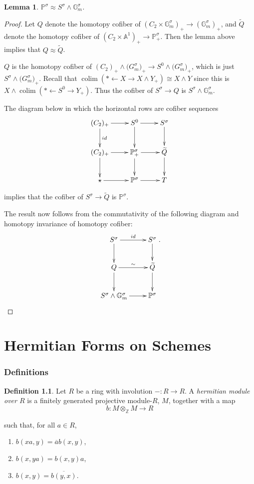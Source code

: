 \documentclass[draftthesis,tocnosub,noragright,centerchapter,10pt]{uiucthesis2009}
\newcommand{\Z}{\mathbb Z}
\newcommand{\mbb}{\mathbb}
\DeclareMathOperator*{\colim}{colim}
\theoremstyle{plain}
\newtheorem{lemma}{Lemma}
\theoremstyle{definition}
\newtheorem{definition}[lemma]{Definition}
\begin{document}
\begin{lemma}
$\mbb P^\sigma \approx S^\sigma \wedge \mbb G_m^\sigma$.
\end{lemma}

\begin{proof}
Let $Q$ denote the homotopy cofiber of $(C_2 \times \mbb G_m^\sigma)_+
\rightarrow (\mbb G_m^\sigma)_+$, and $\widetilde Q$ denote the homotopy
cofiber of $(C_2 \times \mbb A^1)_+ \rightarrow \mbb P^\sigma_+$. Then the
lemma above implies that $Q \approx \widetilde Q$. 

$Q$ is the homotopy cofiber of $
(C_2)_+ \wedge \mbb (G_m^\sigma)_+ \rightarrow S^0 \wedge \mbb
(G_m^\sigma)_+$, which is just $S^\sigma \wedge \mbb
(G_m^\sigma)_+$. Recall that $\colim(* \leftarrow X \rightarrow X
\wedge Y_+) \cong X \wedge Y$ since this is $X \wedge \colim(*
\leftarrow S^0 \rightarrow Y_+)$. Thus the cofiber of $S^\sigma
\rightarrow Q$ is $S^\sigma \wedge \mbb G_m^\sigma$.

The diagram below in which the horizontal rows are cofiber sequences
\[
\xymatrix{(C_2)_+ \ar[r]\ar[d]^{id} & S^0 \ar[d] \ar[r]& S^\sigma
  \ar[d] \\(C_2)_+ \ar[r]\ar[d] & \ar[r]\ar[d] \mbb P^\sigma_+ & \widetilde
  Q \ar[d] \\ \star \ar[r] & \mbb P^\sigma \ar[r] & T }
\]

implies that the cofiber of $S^\sigma \rightarrow \widetilde Q$ is
$\mbb P^\sigma$. 

The result now follows from the commutativity of the following diagram
and homotopy invariance of homotopy cofiber:
\[
\xymatrix{S^\sigma \ar[r]^{id}\ar[d] & S^\sigma \ar[d] \\ Q \ar[r]^{\sim} \ar[d]&
\widetilde Q \ar[d]\\ S^\sigma \wedge \mbb G_m^\sigma \ar[r] & \mbb P^\sigma}.
\]

\end{proof}

\chapter{Hermitian Forms on Schemes}\label{chap:herm_form_sch}

\subsection{Definitions}

\begin{definition}
Let $R$ be a ring with involution $- : R \rightarrow R$. A \emph{hermitian
module over $R$} is a finitely generated projective module-$R$, $M$, together
with a map
\[
b : M \otimes_{\Z} M \rightarrow R
\]  

such that, for all $a \in R$,
\begin{enumerate}
\item $b(xa,y) = \overline a b(x,y)$,
\item $b(x,ya) = b(x,y) a$,
\item $b(x,y) = \overline{b(y,x)}$.
\end{enumerate}
\end{definition}
\end{document}

